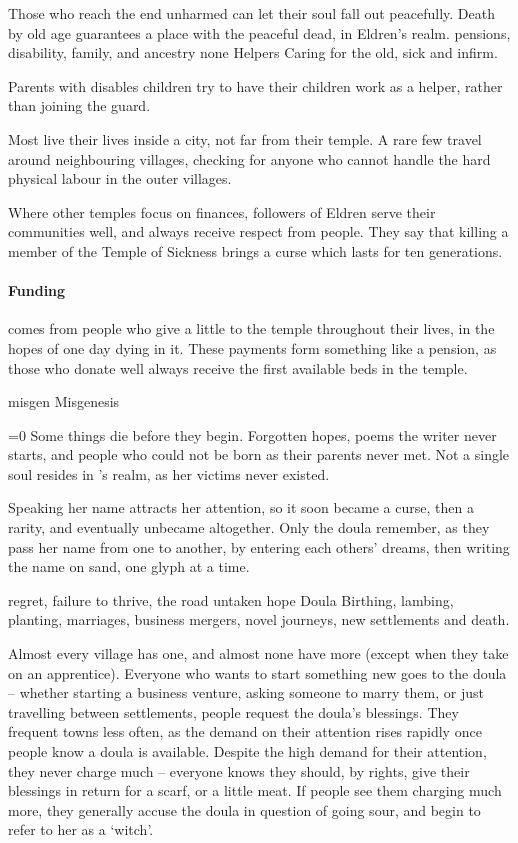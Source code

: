 \begin{multicols}{2}
{    Those who reach the end unharmed can let their soul fall out peacefully.
    Death by old age guarantees a place with the peaceful dead, in Eldren's realm.
  }%
  {pensions, disability, family, and ancestry}%
  {none}%
  {Helpers}%
  {
    Caring for the old, sick and infirm.
  }%

Parents with disables children try to have their children work as a helper, rather than joining the \gls{guard}.

Most live their lives inside a city, not far from their temple.
A rare few travel around neighbouring \glspl{village}, checking for anyone who cannot handle the hard physical labour in the outer \glspl{village}.

Where other temples focus on finances, followers of Eldren serve their communities well, and always receive respect from people.
They say that killing a member of the Temple of Sickness brings a curse which lasts for ten generations.

\paragraph{Funding}
comes from people who give a little to the temple throughout their lives, in the hopes of one day dying in it.
These payments form something like a pension, as those who donate well always receive the first available beds in the temple.

\guild{\hphantom{Nulla}}%
  {\gls{misgen}}%
  {Misgenesis}%
  {
  \ifnum\value{temperature}=0\fi
  Some things die before they begin.
  Forgotten hopes, poems the writer never starts, and people who could not be born as their parents never met.
  Not a single soul resides in \hphantom{Nulla}'s realm, as her victims never existed.

  Speaking her name attracts her attention, so it soon became a curse, then a rarity, and eventually unbecame altogether.
  Only the doula remember, as they pass her name from one to another, by entering each others' dreams, then writing the name on sand, one glyph at a time.
  }%
  {regret, failure to thrive, the road untaken}%
  {hope}%
  {Doula}%
  {
    Birthing, lambing, planting, marriages, business mergers, novel journeys, new settlements and death.
  }%

Almost every \gls{village} has one, and almost none have more (except when they take on an apprentice).
Everyone who wants to start something new goes to the doula -- whether starting a business venture, asking someone to marry them, or just travelling between settlements, people request the doula's blessings.
They frequent towns less often, as the demand on their attention rises rapidly once people know a doula is available.
Despite the high demand for their attention, they never charge much -- everyone knows they should, by rights, give their blessings in return for a scarf, or a little meat.
If people see them charging much more, they generally accuse the doula in question of going sour, and begin to refer to her as a `witch'.


\end{multicols}
